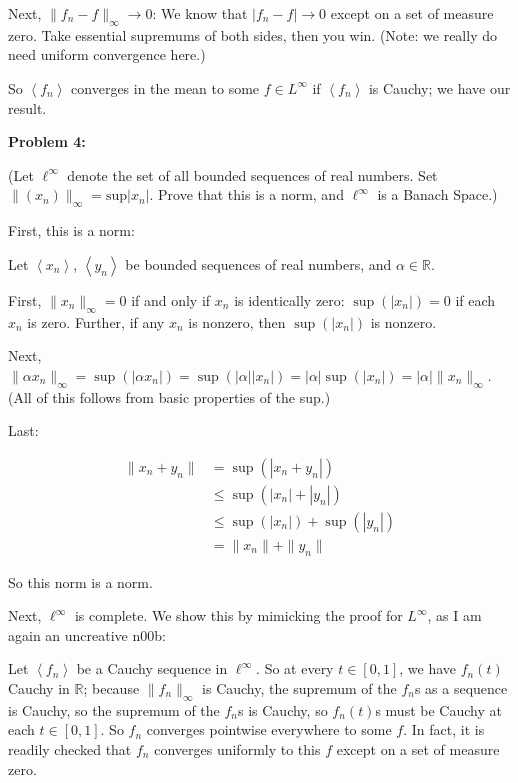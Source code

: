 \documentclass[a4paper,12pt]{article}
\newcommand{\tab}{\hspace{4mm}} %
\newcommand{\shunt}{\vspace{20mm}}
\newcommand{\absval}[1]{\left\lvert #1 \right\rvert}
\newcommand{\norm}[1]{\|#1\|}
\newcommand{\anbrack}[1]{\left\langle #1 \right\rangle}
\newcommand{\al}{\alpha} %
\newcommand{\R}{\mathbb{R}}
\begin{document}
\tab Next, $\norm{f_n - f}_\infty \to 0$: We know that $\absval{f_n-f} \to 0$ except on a set of measure zero. Take essential supremums of both sides, then you win. (Note: we really do need uniform convergence here.)

\tab So $\anbrack{f_n}$ converges in the mean to some $f \in L^\infty$ if $\anbrack{f_n}$ is Cauchy; we have our result.

\shunt

{\bf Problem 4:} 

(Let $\ell^\infty$ denote the set of all bounded sequences of real numbers. Set $\norm{(x_n)}_\infty = \text{sup}\absval{x_n}$. Prove that this is a norm, and $\ell^\infty$ is a Banach Space.)

First, this is a norm:

Let $\anbrack{x_n}$, $\anbrack{y_n}$ be bounded sequences of real numbers, and $\al \in \R$.

\tab First, $\norm{x_n}_\infty = 0$ if and only if $x_n$ is identically zero: $\sup(\absval{x_n}) = 0$ if each $x_n$ is zero. Further, if any $x_n$ is nonzero, then $\sup(\absval{x_n})$ is nonzero.

\tab Next, $\norm{\al x_n}_\infty = \sup(\absval{\al x_n}) = \sup(\absval{\al}\absval{x_n}) = \absval{\al}\sup(\absval{x_n}) = \absval{\al}\norm{x_n}_\infty$. (All of this follows from basic properties of the sup.)

\tab Last:

\begin{align*}
\norm{x_n+y_n} &= \sup(\absval{x_n+y_n})\\
&\leq \sup(\absval{x_n}+\absval{y_n})\\
&\leq \sup(\absval{x_n})+\sup(\absval{y_n})\\
&=\norm{x_n}+\norm{y_n}
\end{align*}

So this norm is a norm.

Next, $\ell^\infty$ is complete. We show this by mimicking the proof for $L^\infty$, as I am again an uncreative n00b:


\tab Let $\anbrack{f_n}$ be a Cauchy sequence in $\ell^\infty$. So at every $t \in [0,1]$, we have $f_n(t)$ Cauchy in $\R$; because $\norm{f_n}_\infty$ is Cauchy, the supremum of the $f_n$s as a sequence is Cauchy, so the supremum of the $f_n$s is Cauchy, so $f_n(t)$s must be Cauchy at each $t \in [0,1]$. So $f_n$ converges pointwise everywhere to some $f$. In fact, it is readily checked that $f_n$ converges uniformly to this $f$ except on a set of measure zero.
\end{document}
